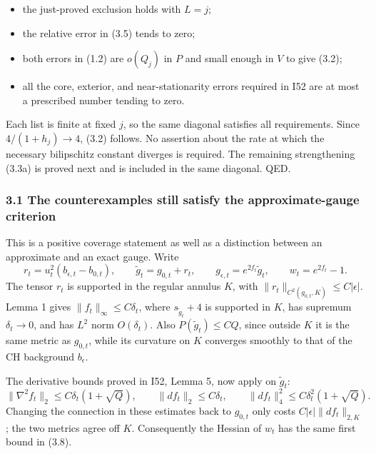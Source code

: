\documentclass[
  10pt,
]{article}
\providecommand{\tightlist}{%
  \setlength{\itemsep}{0pt}\setlength{\parskip}{0pt}}
\begin{document}
\begin{itemize}
\tightlist
\item
  the just-proved exclusion holds with \(L=j\);
\item
  the relative error in (3.5) tends to zero;
\item
  both errors in (1.2) are \(o(Q_j)\) in \(P\) and small enough in \(V\)
  to give (3.2);
\item
  all the core, exterior, and near-stationarity errors required in I52
  are at most a prescribed number tending to zero.
\end{itemize}

Each list is finite at fixed \(j\), so the same diagonal satisfies all
requirements. Since \(4/(1+h_j)\to4\), (3.2) follows. No assertion about
the rate at which the necessary bilipschitz constant diverges is
required. The remaining strengthening (3.3a) is proved next and is
included in the same diagonal. QED.

\hypertarget{the-counterexamples-still-satisfy-the-approximate-gauge-criterion}{%
\subsubsection{3.1 The counterexamples still satisfy the
approximate-gauge
criterion}\label{the-counterexamples-still-satisfy-the-approximate-gauge-criterion}}

This is a positive coverage statement as well as a distinction between
an approximate and an exact gauge. Write \[
 r_t=u_t^2(b_{\epsilon,t}-b_{0,t}),\qquad
 \widetilde g_t=g_{0,t}+r_t,\qquad
 g_{\epsilon,t}=e^{2f_t}\widetilde g_t,\qquad w_t=e^{2f_t}-1.
\] The tensor \(r_t\) is supported in the regular annulus \(K\), with
\(\|r_t\|_{C^2(g_{0,t},K)}\le C|\epsilon|\). Lemma 1 gives
\(\|f_t\|_\infty\le C\delta_t\), where \(s_{\widetilde g_t}+4\) is
supported in \(K\), has supremum \(\delta_t\to0\), and has \(L^2\) norm
\(O(\delta_t)\). Also \(P(\widetilde g_t)\le C Q\), since outside \(K\)
it is the same metric as \(g_{0,t}\), while its curvature on \(K\)
converges smoothly to that of the CH background \(b_\epsilon\).

The derivative bounds proved in I52, Lemma 5, now apply on
\(\widetilde g_t\): \[
 \|\nabla^2 f_t\|_2\le C\delta_t(1+\sqrt Q),\qquad
 \|df_t\|_2\le C\delta_t,\qquad
 \|df_t\|_4^2\le C\delta_t^2(1+\sqrt Q).               \tag{3.8}
\] Changing the connection in these estimates back to \(g_{0,t}\) only
costs \(C|\epsilon|\|df_t\|_{2,K}\); the two metrics agree off \(K\).
Consequently the Hessian of \(w_t\) has the same first bound in (3.8).
\end{document}
